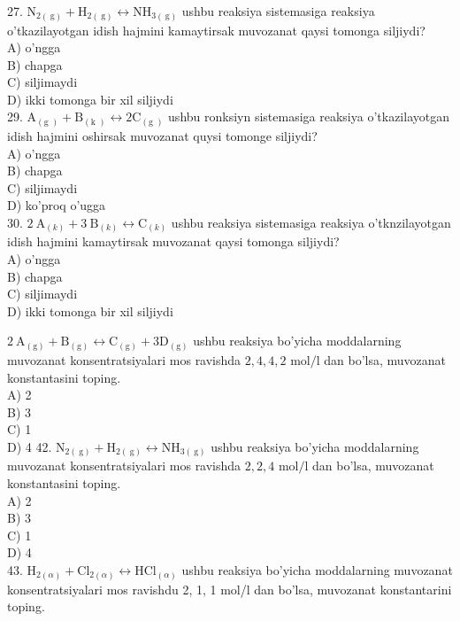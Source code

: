 27. $\mathrm{N}_{2(\mathrm{~g})}+\mathrm{H}_{2(\mathrm{~g})} \leftrightarrow \mathrm{NH}_{3(\mathrm{~g})}$ ushbu reaksiya sistemasiga reaksiya o'tkazilayotgan idish hajmini kamaytirsak muvozanat qaysi tomonga siljiydi?\\
A) o'ngga\\
B) chapga\\
C) siljimaydi\\
D) ikki tomonga bir xil siljiydi\\
29. $\mathrm{A}_{(\text {g })}+\mathrm{B}_{(\text {k })} \leftrightarrow 2 \mathrm{C}_{(\text {g })}$ ushbu ronksiyn sistemasiga reaksiya o'tkazilayotgan idish hajmini oshirsak muvozanat quysi tomonge siljiydi?\\
A) o'ngga\\
B) chapga\\
C) siljimaydi\\
D) ko'proq o'ugga\\
30. $2 \mathrm{~A}_{(k)}+3 \mathrm{~B}_{(k)} \leftrightarrow \mathrm{C}_{(k)}$ ushbu reaksiya sistemasiga reaksiya o'tknzilayotgan idish hajmini kamaytirsak muvozanat qaysi tomonga siljiydi?\\
A) o'ngga\\
B) chapga\\
C) siljimaydi\\
D) ikki tomonga bir xil siljiydi
  \item $2 \mathrm{~A}_{(\mathrm{g})}+\mathrm{B}_{(\mathrm{g})} \leftrightarrow \mathrm{C}_{(\mathrm{g})}+3 \mathrm{D}_{(\mathrm{g})}$ ushbu reaksiya bo'yicha moddalarning muvozanat konsentratsiyalari mos ravishda $2,4,4,2$ $\mathrm{mol} / \mathrm{l}$ dan bo'lsa, muvozanat konstantasini toping.\\
A) 2\\
B) 3\\
C) 1\\
D) 4
42. $\mathrm{N}_{2(\mathrm{~g})}+\mathrm{H}_{2(\mathrm{~g})} \leftrightarrow \mathrm{NH}_{3(\mathrm{~g})}$ ushbu reaksiya bo'yicha moddalarning muvozanat konsentratsiyalari mos ravishda $2,2,4$ $\mathrm{mol} / \mathrm{l}$ dan bo'lsa, muvozanat konstantasini toping.\\
A) 2\\
B) 3\\
C) 1\\
D) 4\\
43. $\mathrm{H}_{2(\alpha)}+\mathrm{Cl}_{2(\alpha)} \leftrightarrow \mathrm{HCl}_{(\alpha)}$ ushbu reaksiya bo'yicha moddalarning muvozanat konsentratsiyalari mos ravishdu 2, 1, 1 mol/l dan bo'lsa, muvozanat konstantarini toping.\\
